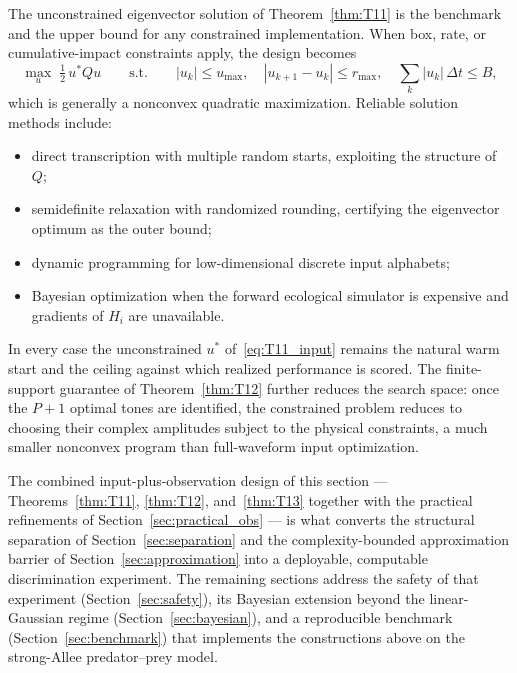 The unconstrained eigenvector solution of Theorem~\ref{thm:T11} is the benchmark and the upper bound for any constrained implementation. When box, rate, or cumulative-impact constraints apply, the design becomes
\begin{equation}
\max_u\; \tfrac{1}{2}\, u^{*} Q u
\qquad\text{s.t.}\qquad
|u_k| \le u_{\max},\quad
|u_{k+1} - u_k| \le r_{\max},\quad
\sum_k |u_k|\, \Delta t \le B,
\label{eq:constrained_opt}
\end{equation}
which is generally a nonconvex quadratic maximization. Reliable solution methods include:
\begin{itemize}
\item direct transcription with multiple random starts, exploiting the structure of \(Q\);
\item semidefinite relaxation with randomized rounding, certifying the eigenvector optimum as the outer bound;
\item dynamic programming for low-dimensional discrete input alphabets;
\item Bayesian optimization when the forward ecological simulator is expensive and gradients of \(H_i\) are unavailable.
\end{itemize}
In every case the unconstrained \(u^{*}\) of~\eqref{eq:T11_input} remains the natural warm start and the ceiling against which realized performance is scored. The finite-support guarantee of Theorem~\ref{thm:T12} further reduces the search space: once the \(P+1\) optimal tones are identified, the constrained problem reduces to choosing their complex amplitudes subject to the physical constraints, a much smaller nonconvex program than full-waveform input optimization.

The combined input-plus-observation design of this section --- Theorems~\ref{thm:T11}, \ref{thm:T12}, and~\ref{thm:T13} together with the practical refinements of Section~\ref{sec:practical_obs} --- is what converts the structural separation of Section~\ref{sec:separation} and the complexity-bounded approximation barrier of Section~\ref{sec:approximation} into a deployable, computable discrimination experiment. The remaining sections address the safety of that experiment (Section~\ref{sec:safety}), its Bayesian extension beyond the linear-Gaussian regime (Section~\ref{sec:bayesian}), and a reproducible benchmark (Section~\ref{sec:benchmark}) that implements the constructions above on the strong-Allee predator--prey model.
